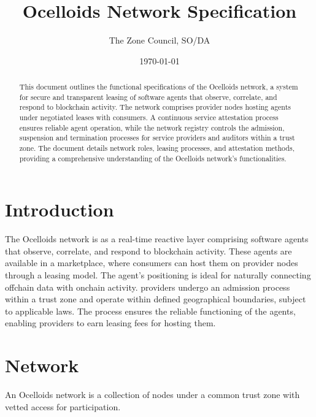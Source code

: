 \documentclass{oc}
\begin{document}
\title{Ocelloids Network Specification}
\author{The Zone Council, SO/DA}
\date{\today}
\maketitle


\begin{abstract}
This document outlines the functional specifications of the Ocelloids network, a system for secure and transparent leasing of software agents that observe, correlate, and respond to blockchain activity.
The network comprises provider nodes hosting agents under negotiated leases with consumers.
A continuous service attestation process ensures reliable agent operation, while the network registry controls the admission, suspension and termination processes for service providers and auditors within a trust zone.
The document details network roles, leasing processes, and attestation methods, providing a comprehensive understanding of the Ocelloids network's functionalities.
\end{abstract}


\newpage

\section{Introduction}\label{sec:introduction}

The Ocelloids network is as a real-time reactive layer comprising software \glspl*{agent} that observe, correlate, and respond to blockchain activity.
These \glspl*{agent} are available in a marketplace, where \glspl*{consumer} can host them on \gls*{provider} nodes through a leasing model.
The agent's positioning is ideal for naturally connecting offchain data with onchain activity.
\Glspl*{provider} undergo an admission process within a trust zone and operate within defined geographical boundaries, subject to applicable laws.
The  process ensures the reliable functioning of the \glspl*{agent}, enabling \glspl*{provider} to earn leasing fees for hosting them.

\section{Network}

An Ocelloids network is a collection of nodes under a common trust zone with vetted access for participation.
\end{document}
